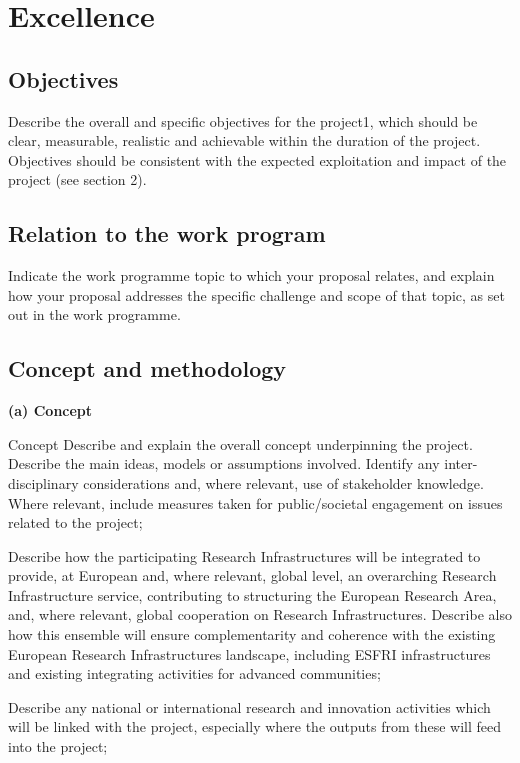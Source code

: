 \chapter{Excellence}



\section{Objectives}

\begin{todo}{}\color{red}
  Describe the overall and specific objectives for the project1, which should be clear, measurable, realistic and achievable within the duration of the project. Objectives should be consistent with the expected exploitation and impact of the project (see section 2).
\end{todo}



\section{Relation to the work program}

\begin{todo}{}\color{red}
  Indicate the work programme topic to which your proposal relates, and explain how your proposal addresses the specific challenge and scope of that topic, as set out in the work programme.
\end{todo}



\section{Concept and methodology}

{\bf \Large (a) Concept}

\begin{todo}{Concept}\color{red}
Describe and explain the overall concept underpinning the project. Describe the main ideas, models or assumptions involved. Identify any inter-disciplinary considerations and, where relevant, use of stakeholder knowledge. Where relevant, include measures taken for public/societal engagement on issues related to the project;
  
Describe how the participating Research Infrastructures will be integrated to provide, at European and, where relevant, global level, an overarching Research Infrastructure service, contributing to structuring the European Research Area, and, where relevant, global cooperation on Research Infrastructures. Describe also how this ensemble will ensure complementarity and coherence with the existing European Research Infrastructures landscape, including ESFRI infrastructures and existing integrating activities for advanced communities;

Describe any national or international research and innovation activities which will be linked with the project, especially where the outputs from these will feed into the project;
\end{todo}

